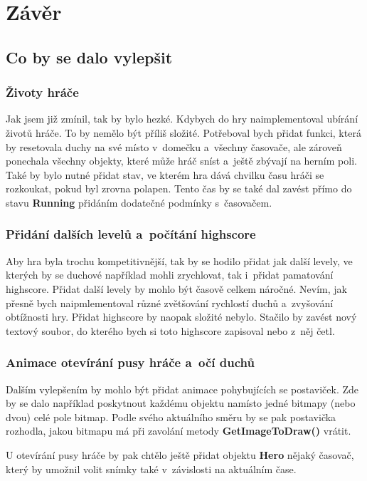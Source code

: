 \documentclass{article}
\begin{document}
\section{Závěr}
\subsection{Co by se dalo vylepšit}
\subsubsection{Životy hráče}
Jak jsem již zmínil, tak by bylo hezké. Kdybych do hry naimplementoval ubírání životů hráče. To by nemělo být příliš složité. Potřeboval bych přidat funkci, která by resetovala duchy na své místo v~domečku a~všechny časovače, ale zároveň ponechala všechny objekty, které může hráč sníst a~ještě zbývají na herním poli. Také by bylo nutné přidat stav, ve kterém hra dává chvilku času hráči se rozkoukat, pokud byl zrovna polapen. Tento čas by se také dal zavést přímo do stavu \textbf{Running} přidáním dodatečné podmínky s~časovačem.

\subsubsection{Přidání dalších levelů a~počítání highscore}
Aby hra byla trochu kompetitivnější, tak by se hodilo přidat jak další levely, ve kterých by se duchové například mohli zrychlovat, tak i~přidat pamatování highscore. Přidat další levely by mohlo být časově celkem náročné. Nevím, jak přesně bych naipmlementoval různé zvětšování rychlostí duchů a~zvyšování obtížnosti hry. Přidat highscore by naopak složité nebylo. Stačilo by zavést nový textový soubor, do kterého bych si toto highscore zapisoval nebo z~něj četl.

\subsubsection{Animace otevírání pusy hráče a~očí duchů}
Dalším vylepšením by mohlo být přidat animace pohybujících se postaviček. Zde by se dalo například poskytnout každému objektu namísto jedné bitmapy (nebo dvou) celé pole bitmap. Podle svého aktuálního směru by se pak postavička rozhodla, jakou bitmapu má při zavolání metody \textbf{GetImageToDraw()} vrátit.

U otevírání pusy hráče by pak chtělo ještě přidat objektu \textbf{Hero} nějaký časovač, který by umožnil volit snímky také v~závislosti na aktuálním čase.
\end{document}
